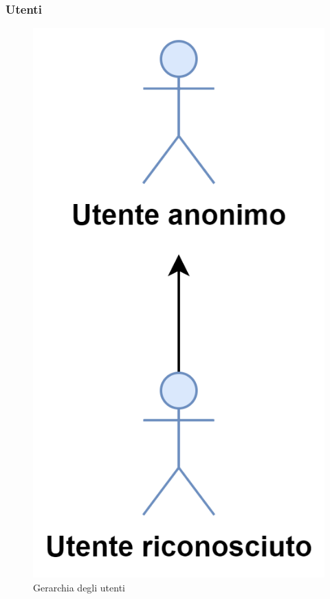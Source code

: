 \subsubsection{Utenti}
\begin{figure}[h]
  \centering
    \includegraphics[scale=0.8]{Sezioni/UseCase/Immagini/Utenti.png}
    \caption{Gerarchia degli utenti}
\end{figure}

